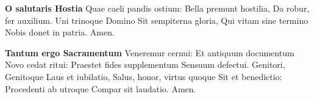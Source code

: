 \documentclass{article}
\begin{document}
\begin{flushleft}
\scriptsize
\begin{multicols}{2}
\noindent \textbf{O salutaris Hostia}\newline
Quae caeli pandis ostium:\newline
Bella premunt hostilia,\newline
Da robur, fer auxilium.\newline
\newline
Uni trinoque Domino \newline
Sit sempiterna gloria,\newline
Qui vitam sine termino \newline
Nobis donet in patria.\newline
Amen.\newline

\noindent \textbf{Tantum ergo Sacramentum}\newline
Veneremur cernui:\newline
Et antiquum documentum\newline
Novo cedat ritui:\newline
Praestet fides supplementum\newline
Sensuum defectui.\newline
\newline
Genitori, Genitoque\newline
Laus et iubilatio,\newline
Salus, honor, virtus quoque\newline
Sit et benedictio:\newline
Procedenti ab utroque\newline
Compar sit laudatio.\newline
Amen.\newline     


\end{multicols}
\end{flushleft}
\end{document}
